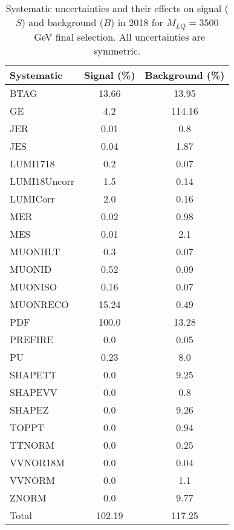 \begin{table}[htbp]
\begin{center}
\caption{Systematic uncertainties and their effects on signal ($S$) and background ($B$) in 2018 for $M_{LQ}=3500$~GeV final selection. All uncertainties are symmetric.}
\begin{tabular}{lcc}
\hline\hline
Systematic & Signal (\%) & Background (\%) \\ \hline 
BTAG & 13.66 & 13.95\\ 
GE & 4.2 & 114.16\\ 
JER & 0.01 & 0.8\\ 
JES & 0.04 & 1.87\\ 
LUMI1718 & 0.2 & 0.07\\ 
LUMI18Uncorr & 1.5 & 0.14\\ 
LUMICorr & 2.0 & 0.16\\ 
MER & 0.02 & 0.98\\ 
MES & 0.01 & 2.1\\ 
MUONHLT & 0.3 & 0.07\\ 
MUONID & 0.52 & 0.09\\ 
MUONISO & 0.16 & 0.07\\ 
MUONRECO & 15.24 & 0.49\\ 
PDF & 100.0 & 13.28\\ 
PREFIRE & 0.0 & 0.05\\ 
PU & 0.23 & 8.0\\ 
SHAPETT & 0.0 & 9.25\\ 
SHAPEVV & 0.0 & 0.8\\ 
SHAPEZ & 0.0 & 9.26\\ 
TOPPT & 0.0 & 0.94\\ 
TTNORM & 0.0 & 0.25\\ 
VVNOR18M & 0.0 & 0.04\\ 
VVNORM & 0.0 & 1.1\\ 
ZNORM & 0.0 & 9.77\\ 
Total & 102.19 & 117.25\\ \hline \hline
\end{tabular}
\label{tab:SysUncertainties_uujj_3500}
\end{center}
\end{table}

